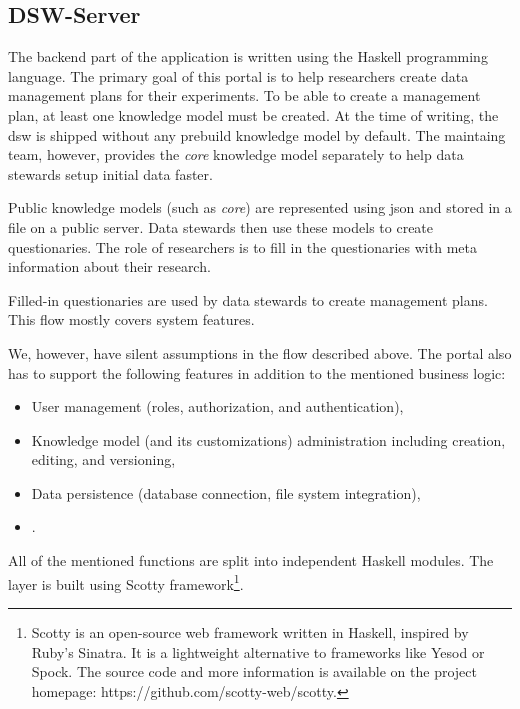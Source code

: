 \subsection{DSW-Server}\label{sec:dsw-server}

The backend part of the application is written using the Haskell programming language.
The primary goal of this portal is to help researchers create data management plans for their experiments.
To be able to create a management plan, at least one knowledge model must be created.
At the time of writing, the \gls{dsw} is shipped without any prebuild knowledge model by default.
The maintaing team, however, provides the \textit{core} knowledge model separately to help data stewards setup initial data faster\cite{gh-km-core}.

Public knowledge models (such as \textit{core}) are represented using \gls{json} and stored in a file on a public server.
Data stewards then use these models to create questionaries.
The role of researchers is to fill in the questionaries with meta information about their research.

Filled-in questionaries are used by data stewards to create management plans.
This flow mostly covers system features.

We, however, have silent assumptions in the flow described above.
The portal also has to support the following features in addition to the mentioned business logic:

\begin{itemize}
    \item User management (roles, authorization, and authentication),
    \item Knowledge model (and its customizations) administration including creation, editing, and versioning,
    \item Data persistence (database connection, file system integration),
    \item {} .
\end{itemize}

All of the mentioned functions are split into independent Haskell modules.
The   layer is built using Scotty framework\footnote{Scotty is an open-source web framework written in Haskell, inspired by Ruby’s Sinatra. It is a lightweight alternative to frameworks like Yesod or Spock. The source code and more information is available on the project homepage: https://github.com/scotty-web/scotty.}.
